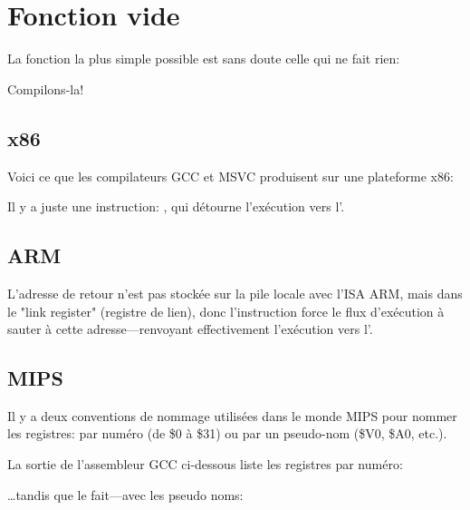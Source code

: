 ﻿\section{Fonction vide}
\label{empty_func}

La fonction la plus simple possible est sans doute celle qui ne fait rien:



Compilons-la!

\subsection{x86}

Voici ce que les compilateurs GCC et MSVC produisent sur une plateforme x86:



Il y a juste une instruction: \RET, qui détourne l'exécution vers l'.

\subsection{ARM}



L'adresse de retour n'est pas stockée sur la pile locale avec l'\ac{ISA} ARM, mais
dans le "link register" (registre de lien), %
donc l'instruction  force le flux d'exécution à sauter à cette adresse---renvoyant
effectivement l'exécution vers l'.

\subsection{MIPS}

Il y a deux conventions de nommage utilisées dans le monde MIPS pour nommer les registres:
par numéro (de \$0 à \$31) ou par un pseudo-nom (\$V0, \$A0, etc.).

La sortie de l'assembleur GCC ci-dessous liste les registres par numéro:



\dots tandis que \IDA le fait---avec les pseudo noms:

